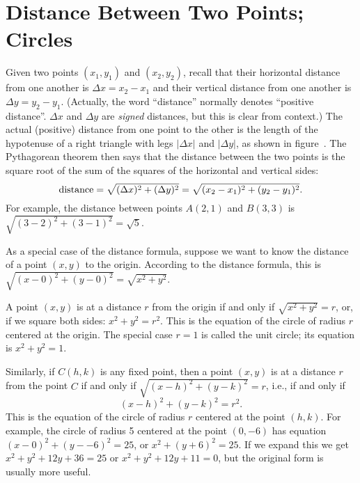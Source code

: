 \section{Distance Between Two Points; Circles}{}{}

Given two points $(x_1,y_1)$ and $(x_2,y_2)$, recall that their
horizontal distance from one another is $\Delta x=x_2-x_1$ and their
vertical distance from one another is $\Delta y=y_2-y_1$.  (Actually,
the word ``distance'' normally denotes ``positive distance''. $\Delta
x$ and $\Delta y$ are {\it signed\/} distances, but this is clear from
context.)  The actual (positive) distance from one point to the other
is the length of the hypotenuse of a right triangle with legs $|\Delta
x|$ and $|\Delta y|$, as shown in figure~.  The Pythagorean theorem then says that the distance between
the two points is the square root of the sum of the squares of the
horizontal and vertical sides:
$$
  \hbox{distance}
    =\sqrt{(\Delta x)^2+(\Delta y)^2}=\sqrt{(x_2-x_1)^2+ (y_2-y_1)^2}.
$$
For example, the distance between points $A(2,1)$ and $B(3,3)$ is
$\sqrt{(3-2)^2+(3-1)^2}=\sqrt{5}$.


As a special case of the distance formula, suppose we want to know the
distance of a point $(x,y)$ to the origin.  According to the distance
formula, this is $\sqrt{(x-0)^2+(y-0)^2}=\sqrt{x^2+y^2}$.

A point $(x,y)$ is at a distance $r$ from the origin if and only if
$\sqrt{x^2+y^2}=r$, or, if we square both sides: $x^2+y^2=r^2$.  This is
the equation of the circle 
of radius $r$ centered at the origin.
The special case $r=1$ is called the unit 
circle; 
its equation is
$x^2+y^2=1$.

Similarly, if $C(h,k)$ is any fixed point, then a point $(x,y)$ is at a
distance $r$ from the point $C$ if and only if $\sqrt{(x-h)^2+(y-k)^2}=r$,
i.e., if and only if 
$$
(x-h)^2+(y-k)^2=r^2.
$$
This is the equation of the circle 
of radius $r$ centered at the
point $(h,k)$.  For example, the circle of radius 5 centered at the
point $(0,-6)$ has equation $(x-0)^2+(y--6)^2=25$, or
$x^2+(y+6)^2=25$.  If we
expand this we get $x^2+y^2+12y+36=25$ or 
$x^2+y^2+12y+11=0$, but the original form is usually more useful.

